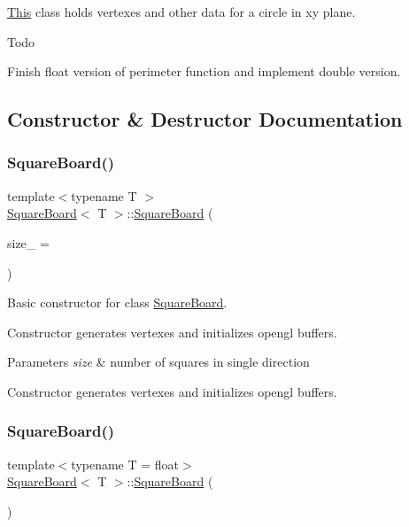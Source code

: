 \mbox{\hyperlink{classThis}{This}} class holds vertexes and other data for a circle in xy plane. 

\begin{DoxyRefDesc}{Todo}
\item[\mbox{\hyperlink{todo__todo000002}{Todo}}]Finish float version of perimeter function and implement double version. \end{DoxyRefDesc}


\subsection{Constructor \& Destructor Documentation}
\mbox{\label{classSquareBoard_aa7aac1a02a00ce9ad0c9441fffa71e02}} 
\subsubsection{\texorpdfstring{Square\+Board()}{SquareBoard()}\hspace{0.1cm}{\footnotesize\ttfamily [1/6]}}
{\footnotesize\ttfamily template$<$typename T $>$ \\
\mbox{\hyperlink{classSquareBoard}{Square\+Board}}$<$ T $>$\+::\mbox{\hyperlink{classSquareBoard}{Square\+Board}} (\begin{DoxyParamCaption}\item[{unsigned}]{size\+\_\+ = {} }\end{DoxyParamCaption})}



Basic constructor for class \mbox{\hyperlink{classSquareBoard}{Square\+Board}}. 

Constructor generates vertexes and initializes opengl buffers. 
\begin{DoxyParams}{Parameters}
{\em size} & number of squares in single direction\\
\hline
\end{DoxyParams}
Constructor generates vertexes and initializes opengl buffers. \mbox{\label{classSquareBoard_a23c495a2419aded87c0b2803de409b5e}} 
\subsubsection{\texorpdfstring{Square\+Board()}{SquareBoard()}\hspace{0.1cm}{\footnotesize\ttfamily [2/6]}}
{\footnotesize\ttfamily template$<$typename T  = float$>$ \\
\mbox{\hyperlink{classSquareBoard}{Square\+Board}}$<$ T $>$\+::\mbox{\hyperlink{classSquareBoard}{Square\+Board}} (\begin{DoxyParamCaption}\item[{\mbox{\hyperlink{classSquareBoard}{Square\+Board}}$<$ T $>$ \&\&}]{ }\end{DoxyParamCaption})\hspace{0.3cm}{\ttfamily [default]}}

